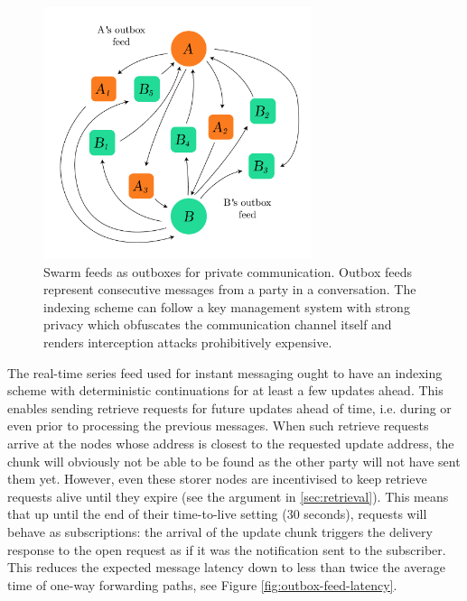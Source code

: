 \begin{figure}[htbp]
  \centering
  \includegraphics[width=0.7\textwidth]{fig/feeds-as-channel.pdf}  
  \caption[Swarm feeds as outboxes \statusgreen]{Swarm feeds as outboxes for private communication. Outbox feeds represent consecutive messages from a party in a conversation. The indexing scheme can follow a key management system with strong privacy which obfuscates the communication channel itself and renders interception attacks prohibitively expensive.}
\label{fig:feeds-as-channel}
\end{figure}


The real-time series feed used for instant messaging ought to have an indexing scheme with deterministic continuations for at least a few updates ahead. This enables sending retrieve requests for future updates ahead of time, i.e. during or even prior to processing the previous messages. When such retrieve requests arrive at the nodes whose address is closest to the requested update address, the chunk will obviously not be able to be found as the other party will not have sent them yet. However, even these storer nodes are incentivised to keep retrieve requests alive until they expire (see the argument in \ref{sec:retrieval}). This means that up until the end of their time-to-live setting (30 seconds), requests will behave as subscriptions: the arrival of the update chunk triggers the delivery response to the open request as if it was the notification sent to the subscriber. This reduces the expected message latency down to less than twice the average time of one-way forwarding paths, see Figure \ref{fig:outbox-feed-latency}. 



